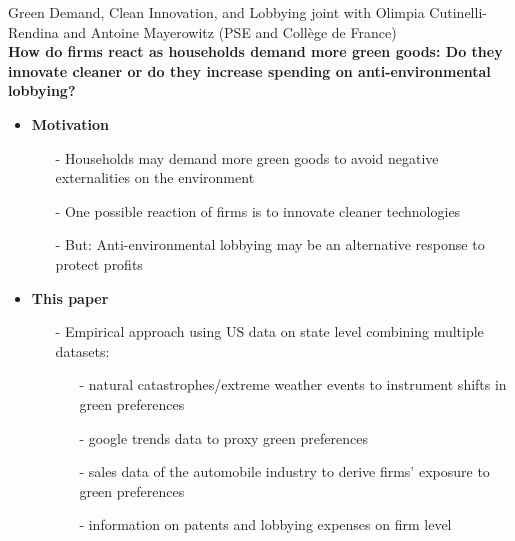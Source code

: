 \begin{frame}{Green Demand, Clean Innovation, and Lobbying}
	\vspace{-5mm}
\hspace{-6mm}\footnotesize{joint with Olimpia Cutinelli-Rendina and Antoine Mayerowitz (PSE and Collège de France)}\\

\footnotesize
\vspace{2mm}
\textbf{\alert{How do firms react as households demand more green goods: Do they innovate cleaner or do they increase spending on anti-environmental lobbying?}}
\pause
\vspace{-1.5mm}
\begin{itemize}[<+->]
 \item \textbf{Motivation }
 \begin{itemize}
 	\item[-] Households may demand more green goods to avoid negative externalities on the environment \footnotesize{\citep{Benabou2010IndividualResponsibility, Bartling2015DoResponsibility}}
 	\item[-] One possible reaction of firms is to innovate cleaner technologies \footnotesize{\citep{Aghion2021EnvironmentalDirty}}
 	\item[-] But: Anti-environmental lobbying may be an alternative response to protect profits
 \end{itemize}
\item \textbf{This paper}
\begin{itemize}
	\item[-] Empirical approach using US data on state level combining multiple datasets:
	\begin{itemize}
		\item[-] natural catastrophes/extreme weather events to instrument shifts in green preferences
		\item[-] google trends data to proxy green preferences
		\item[-] sales data of the automobile industry to derive firms' exposure to green preferences
		\item[-] information on patents and lobbying expenses on firm level
	\end{itemize}
\end{itemize}
\end{itemize}
\end{frame}

